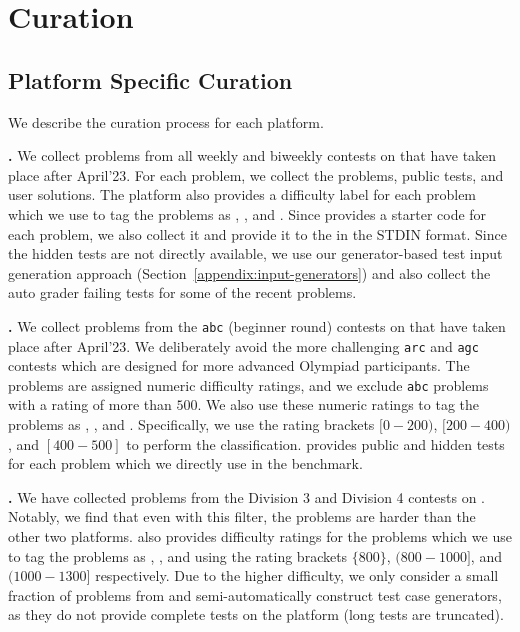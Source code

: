 \section{Curation}
\label{app:sec:curation}



\subsection{Platform Specific Curation}
\label{subsec:platform-specific}
We describe the curation process for each platform.

\vspace{2pt}
\noindent \textbf{\leetcode{}.}
We collect problems from all weekly and biweekly contests on \leetcode{} that have taken place after April'23.
For each problem, we collect the problems, public tests, and user solutions.
The platform also provides a difficulty label for each problem which we use to tag the problems as \easy{}, \medium{}, and \hard{}.
Since \leetcode{} provides a starter code for each problem, we also collect it and provide it to the \llm{} in the STDIN format.
Since the hidden tests are not directly available, we use our generator-based test input generation approach (Section~\ref{appendix:input-generators}) and also collect the auto grader failing tests for some of the recent problems.

\vspace{2pt}
\noindent \textbf{\atcoder{}.}
We collect problems from the \texttt{abc} (beginner round) contests on \atcoder{} that have taken place after April'23. 
We deliberately avoid the more challenging \texttt{arc} and \texttt{agc} contests which are designed for more advanced Olympiad participants.
The problems are assigned numeric difficulty ratings, and we exclude \texttt{abc} problems with a rating of more than $500$.
We also use these numeric ratings to tag the problems as \easy{}, \medium{}, and \hard{}.
Specifically, we use the rating brackets $[0-200)$, $[200-400)$, and $[400-500]$ to perform the classification.
\atcoder{} provides public and hidden tests for each problem which we directly use in the benchmark.

\vspace{2pt}
\noindent \textbf{\codeforces{}.}
We have collected problems from the Division 3 and Division 4 contests on \codeforces{}.
Notably, we find that even with this filter, the problems are harder than the other two platforms.
\codeforces{} also provides difficulty ratings for the problems which we use to tag the problems as \easy{}, \medium{}, and \hard{} using the rating brackets $\{800\}$, $(800-1000]$, and $(1000-1300]$ respectively.
Due to the higher difficulty, we only consider a small fraction of problems from \codeforces{} and semi-automatically construct test case generators, as they do not provide complete tests on the platform (long tests are truncated).

